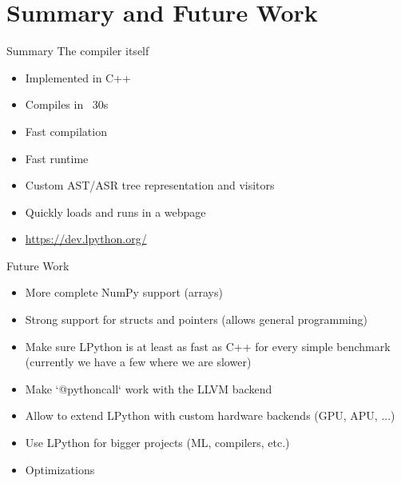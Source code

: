 \section{Summary and Future Work}
    \begin{frame}{Summary}
        The compiler itself
        \begin{itemize}
            \item Implemented in C++
            \item Compiles in ~30s
            \item Fast compilation
            \item Fast runtime
            \item Custom AST/ASR tree representation and visitors
            \item Quickly loads and runs in a webpage
            \item \href{https://dev.lpython.org/}{https://dev.lpython.org/}
        \end{itemize}
    \end{frame}
    
    \begin{frame}{Future Work}
        \begin{itemize}
            \item More complete NumPy support (arrays)
            \item Strong support for structs and pointers (allows general
            programming)
            \item Make sure LPython is at least as fast as C++ for every simple
            benchmark (currently we have a few where we are slower)
            \item Make ‘@pythoncall‘ work with the LLVM backend
            \item Allow to extend LPython with custom hardware backends
            (GPU, APU, ...)
            \item Use LPython for bigger projects (ML, compilers, etc.)
            \item Optimizations
        \end{itemize}
    \end{frame}
